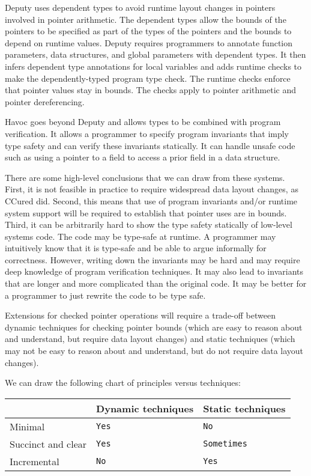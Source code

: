 Deputy \cite{Condit2007,Feng2006} uses dependent types to avoid runtime layout changes
in pointers involved in pointer arithmetic. The dependent types allow the bounds of
the pointers to be specified as part of the types of the pointers and
the bounds to depend on runtime values. Deputy requires programmers to
annotate function parameters, data structures, and global parameters
with dependent types. It then infers dependent type annotations for
local variables and adds runtime checks to make the dependently-typed
program type check. The runtime checks enforce that pointer values stay
in bounds. The checks apply to pointer arithmetic and pointer
dereferencing.

Havoc \cite{Condit2009} goes beyond Deputy and allows types to be combined with program
verification. It allows a programmer to specify program invariants that
imply type safety and can verify these invariants statically. It can
handle unsafe code such as using a pointer to a field to access a prior
field in a data structure.

There are some high-level conclusions that we can draw from these
systems. First, it is not feasible in practice to require widespread
data layout changes, as CCured did. Second, this means that use of
program invariants and/or runtime system support will be required to
establish that pointer uses are in bounds. Third, it can be arbitrarily
hard to show the type safety statically of low-level systems
code. The code may be type-safe at runtime. A programmer may intuitively know
that it is type-safe and be able to argue informally for correctness.
However, writing down the invariants may be hard and may require deep
knowledge of program verification techniques. It may also lead to
invariants that are longer and more complicated than the original code.
It may be better for a programmer to just rewrite the code to be type
safe.

Extensions for checked pointer operations will require a trade-off between
dynamic techniques for checking pointer bounds (which are easy to reason
about and understand, but require data layout changes) and static
techniques (which may not be easy to reason about and understand, but do
not require data layout changes).

We can draw the following chart of principles versus techniques:

\begin{longtable}[c]{@{}lll@{}}
\toprule
& Dynamic techniques & Static techniques\tabularnewline
\midrule
\endhead
Minimal & \texttt{Yes} & \texttt{No}\tabularnewline
Succinct and clear & \texttt{Yes} & \texttt{Sometimes}\tabularnewline
Incremental & \texttt{No} & \texttt{Yes}\tabularnewline
\bottomrule
\end{longtable}

